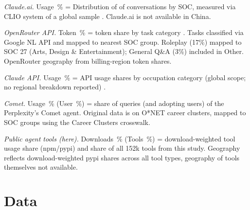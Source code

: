 \documentclass[manuscript,screen,nonacm,oneside]{acmart}
\begin{document}
\begin{table}[htbp]
\begin{minipage}{\linewidth}
\textit{Claude.ai.} Usage~\% = Distribution of of conversations by SOC, measured via CLIO system of a global sample \citep{anthropic2026aeiv4}. Claude.ai is not available in China.

\textit{OpenRouter API.} Token~\% = token share by task category \citep{aubakirova2025state}. Tasks classified via Google NL API and mapped to nearest SOC group. Roleplay (17\%) mapped to SOC 27 (Arts, Design \& Entertainment); General Q\&A (3\%) included in Other. OpenRouter geography from billing-region token shares.

\textit{Claude API.} Usage~\% = API usage shares by occupation category (global scope; no regional breakdown reported) \citep{anthropic2026aeiv4}.

\textit{Comet.} Usage~\% (User~\%) = share of queries (and adopting users) of the Perplexity's Comet agent. Original data is on O*NET career clusters, mapped to SOC groups using the Career Clusters crosswalk. \citep{perplexityCometBrowser}

\textit{Public agent tools (here).} Downloads~\% (Tools~\%) = download-weighted tool usage share (npm/pypi) and share of all 152k tools from this study. Geography reflects download-weighted pypi shares across all tool types, geography of tools themselves not available.
\end{minipage}
\end{table}

\section{Data}
\label{sec:data}
\end{document}
